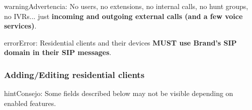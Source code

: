 \documentclass[letterpaper,10pt,spanish]{sphinxmanual}
\begin{document}
\begin{notice}{warning}{Advertencia:}
No users, no extensions, no internal calls, no hunt groups, no IVRs... just \textbf{incoming and outgoing external
calls (and a few voice services)}.
\end{notice}

\begin{notice}{error}{Error:}
Residential clients and their devices \textbf{MUST use Brand's SIP domain in their SIP messages}.
\end{notice}


\subsubsection{Adding/Editing residential clients}
\label{administration_portal/brand/clients/residential:adding-editing-residential-clients}
\begin{notice}{hint}{Consejo:}
Some fields described below may not be visible depending on enabled features.
\end{notice}
\end{document}
